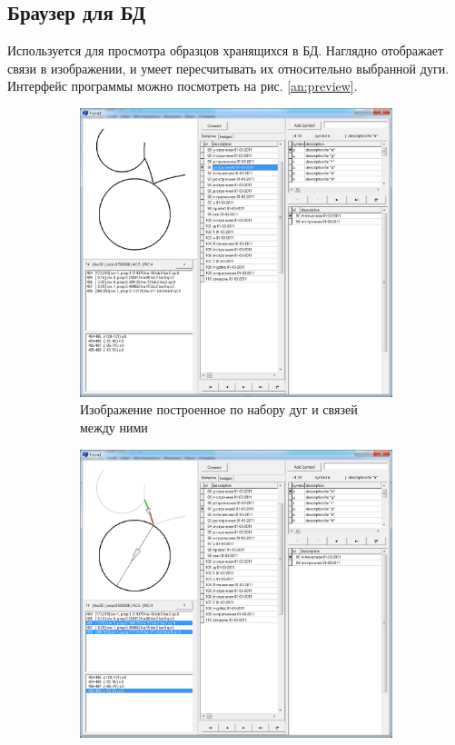 \subsection{Браузер для БД}
Используется для просмотра образцов хранящихся в БД. 
Наглядно отображает связи в изображении, и умеет пересчитывать их относительно выбранной дуги. Интерфейс программы можно посмотреть на рис. \ref{an:preview}.
\begin{figure}[h]
	\begin{subfigure}{.5\textwidth}
		\centering
		\includegraphics[width=.9\linewidth]{images/an_preview_1}
		\caption{Изображение построенное по набору дуг и связей между ними}
	\end{subfigure}
	\begin{subfigure}{.5\textwidth}
		\centering
		\includegraphics[width=.9\linewidth]{images/an_preview_2}

\end{subfigure}
\end{figure}
